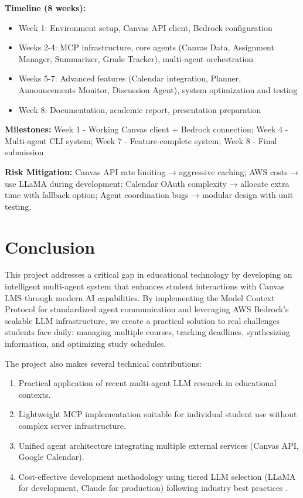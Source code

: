 \documentclass{article}
\begin{document}
\textbf{Timeline (8 weeks):}

\begin{itemize}

\item Week 1: Environment setup, Canvas API client, Bedrock configuration

\item Weeks 2-4: MCP infrastructure, core agents (Canvas Data, Assignment Manager, Summarizer, Grade Tracker), multi-agent orchestration

\item Weeks 5-7: Advanced features (Calendar integration, Planner, Announcements Monitor, Discussion Agent), system optimization and testing

\item Week 8: Documentation, academic report, presentation preparation
\end{itemize}

\textbf{Milestones:} Week 1 - Working Canvas client + Bedrock connection; Week 4 - Multi-agent CLI system; Week 7 - Feature-complete system; Week 8 - Final submission

\textbf{Risk Mitigation:} Canvas API rate limiting → aggressive caching; AWS costs → use LLaMA during development; Calendar OAuth complexity → allocate extra time with fallback option; Agent coordination bugs → modular design with unit testing.

\section{Conclusion}
This project addresses a critical gap in educational technology \cite{genai2024higher} by developing an intelligent multi-agent system that enhances student interactions with Canvas LMS through modern AI capabilities. By implementing the Model Context Protocol \cite{mcp2025landscape, mcpagentic2025} for standardized agent communication and leveraging AWS Bedrock's scalable LLM infrastructure, we create a practical solution to real challenges students face daily: managing multiple courses, tracking deadlines, synthesizing information, and optimizing study schedules.

The project also makes several technical contributions:
\begin{enumerate}
\item Practical application of recent multi-agent LLM research \cite{wang2025megaagent, chen2024llmma} in educational contexts.
\item Lightweight MCP implementation \cite{mcp2025survey, mcpsecurity2025} suitable for individual student use without complex server infrastructure.
\item Unified agent architecture integrating multiple external services (Canvas API, Google Calendar).
\item Cost-effective development methodology using tiered LLM selection (LLaMA for development, Claude for production) following industry best practices \cite{anthropic2025multiagent}.
\end{enumerate}
\end{document}
